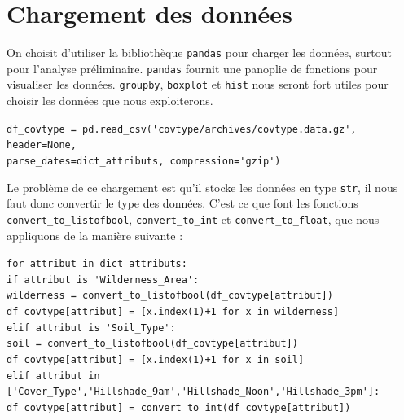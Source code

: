 \documentclass[12pt,a4paper]{article}
\numberwithin{equation}{section}
\begin{document}
	\hrulefill

	\tableofcontents
	
	\newpage
	
	\section{Chargement des données}
	
	On choisit d'utiliser la bibliothèque \verb!pandas! pour charger les données, surtout pour l'analyse préliminaire. \verb!pandas! fournit une panoplie de fonctions pour visualiser les données. \verb!groupby!, \verb!boxplot! et \verb!hist! nous seront fort utiles pour choisir les données que nous exploiterons.\\
	
	\medskip
	\medskip
	
	\quad \quad \quad \verb!df_covtype = pd.read_csv('covtype/archives/covtype.data.gz', header=None,!\\
	\quad \quad \quad \quad \quad \quad \quad \quad \quad \quad \quad \quad \quad  \quad \quad \quad \verb!parse_dates=dict_attributs, compression='gzip')! \\
	
	\medskip
	\medskip
	
	Le problème de ce chargement est qu'il stocke les données en type \verb!str!, il nous faut donc convertir le type des données. C'est ce que font les fonctions \verb!convert_to_listofbool!, \verb!convert_to_int! et \verb!convert_to_float!, que nous appliquons de la manière suivante : \\
	\medskip
	\medskip
	
	\quad \verb!for attribut in dict_attributs:! \\
	
	\quad \quad \verb!if attribut is 'Wilderness_Area':!\\
	\quad \quad \quad \verb!wilderness = convert_to_listofbool(df_covtype[attribut])!\\
	\quad \quad \quad \verb!df_covtype[attribut] = [x.index(1)+1 for x in wilderness]!\\
	
	\quad \quad \verb!elif attribut is 'Soil_Type':!\\
	\quad \quad \quad \verb!soil = convert_to_listofbool(df_covtype[attribut])!\\
	\quad \quad \quad \verb!df_covtype[attribut] = [x.index(1)+1 for x in soil]!\\
	
	\quad \quad \verb!elif attribut in ['Cover_Type','Hillshade_9am','Hillshade_Noon','Hillshade_3pm']:!\\
	\quad \quad \quad \verb!df_covtype[attribut] = convert_to_int(df_covtype[attribut])!\\
	
\end{document}
